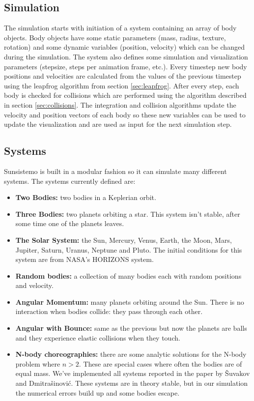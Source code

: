 \documentclass[a4paper]{article}
\begin{document}
\subsection{Simulation}
The simulation starts with initiation of a system containing an array of body objects. Body objects
have some static parameters (mass, radius, texture, rotation) and some dynamic variables (position,
velocity) which can be changed during the simulation. The system also defines some simulation and
visualization parameters (stepsize, steps per animation frame, etc.). Every timestep new body
positions and velocities are calculated from the values of the previous timestep using the leapfrog
algorithm from section \ref{sec:leapfrog}. After every step, each body is checked for collisions
which are performed using the algorithm described in section \ref{sec:collisions}. The integration
and collision algorithms update the velocity and position vectors of each body so these new
variables can be used to update the visualization and are used as input for the next simulation
step.

\subsection{Systems}
Sunsistemo is built in a modular fashion so it can simulate many different systems. The systems
currently defined are:
\begin{itemize}
\item \textbf{Two Bodies:} two bodies in a Keplerian orbit.
\item \textbf{Three Bodies:} two planets orbiting a star. This system isn't stable, after some time
  one of the planets leaves.
\item \textbf{The Solar System:} the Sun, Mercury, Venus, Earth, the Moon, Mars, Jupiter, Saturn,
  Uranus, Neptune and Pluto. The initial conditions for this system are from NASA's HORIZONS system.
  \cite{stan}
\item \textbf{Random bodies:} a collection of many bodies each with random positions and velocity.
\item \textbf{Angular Momentum:} many planets orbiting around the Sun. There is no interaction when
  bodies collide: they pass through each other.
\item \textbf{Angular with Bounce:} same as the previous but now the planets are balls and they
  experience elastic collisions when they touch.
\item \textbf{N-body choreographies:} there are some analytic solutions for the N-body problem where
  $n>2$. These are special cases where often the bodies are of equal mass. We've implemented all
  systems reported in the paper by {{\v S}uvakov} and {Dmitra{\v s}inovi{\'c}}.
  \cite{three-body-planar} These systems are in theory stable, but in our simulation the numerical
  errors build up and some bodies escape.
\end{itemize}
\end{document}
